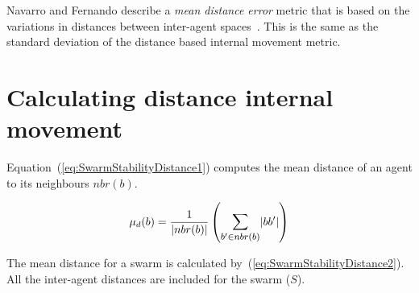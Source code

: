 \documentclass{ieeeaccess}
\begin{document}

Navarro and Fernando describe a \emph{mean distance error} metric that is based on the variations in distances between inter-agent spaces~\cite{NIM:09}. This is the same as the standard deviation of the distance based internal movement metric. 



\section{Calculating distance internal movement}
Equation~(\ref{eq:SwarmStabilityDistance1}) computes the mean distance of an agent to its neighbours $nbr(b)$. 

\begin{equation}
\label{eq:SwarmStabilityDistance1}
\mu_d(b) = \frac{1}{\mathlarger{|nbr(b)|}}\left({\mathlarger{\sum_{b' \in nbr(b)}}|bb'|}\right)
\end{equation}

The mean distance for a swarm is calculated by~(\ref{eq:SwarmStabilityDistance2}). All the inter-agent distances are included for the swarm ($S$). 

\end{document}

